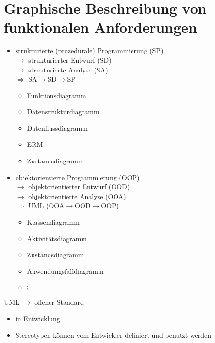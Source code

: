 \section{Graphische Beschreibung von funktionalen Anforderungen}
\begin{itemize}
\item strukturierte (prozedurale) Programmierung (SP)\\
$\to$ strukturierter Entwurf (SD)\\
$\to$ strukturierte Analyse (SA)\\
$\Rightarrow$ SA$\to$SD$\to$SP
\begin{itemize}
\item Funktionsdiagramm
\item Datenstrukturdiagramm
\item Datenflussdiagramm
\item ERM
\item Zustandsdiagramm
\end{itemize}
\item objektorientierte Programmierung (OOP)\\
$\to$ objektorientierter Entwurf (OOD)\\
$\to$ objektorientierte Analyse (OOA)\\
$\Rightarrow$ UML (OOA$\to$OOD$\to$OOP)
\begin{itemize}
\item Klassendiagramm
\item Aktivitätsdiagramm
\item Zustandsdiagramm
\item Anwendungsfalldiagramm
\item[] $\vdots$
\end{itemize}
\end{itemize}
UML $\to$ offener Standard
\begin{itemize}[label=$\to$]
\item in Entwicklung
\item Stereotypen können vom Entwickler definiert und benutzt werden
\end{itemize}

